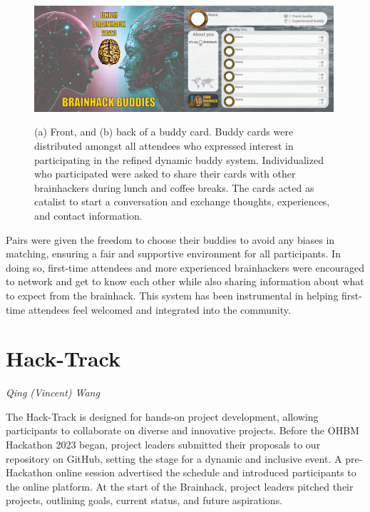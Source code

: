 \documentclass{article}
\newcommand\coordinator[1]{\begin{flushleft}\small\textit{#1}\end{flushleft}}
\begin{document}
\begin{figure}[hbt!]
    \centering
    \includegraphics[width=0.99\textwidth]{images/buddy-system.png}
    \label{fig:buddy-system}
    \caption{
        (a) Front, and (b) back of a buddy card.
        Buddy cards were distributed amongst all attendees who expressed interest in participating in the refined dynamic buddy system.
        Individualized who participated were asked to share their cards with other brainhackers during lunch and coffee breaks.
        The cards acted as catalist to start a conversation and exchange thoughts, experiences, and contact information.
    }
\end{figure}

Pairs were given the freedom to choose their buddies to avoid any biases in matching, ensuring a fair and supportive environment for all participants.
In doing so, first-time attendees and more experienced brainhackers were encouraged to network and get to know each other while also sharing information about what to expect from the brainhack.
This system has been instrumental in helping first-time attendees feel welcomed and integrated into the community.


\section{Hack-Track}
\coordinator{Qing (Vincent) Wang}

The Hack-Track is designed for hands-on project development, allowing participants to collaborate on diverse and innovative projects.
Before the OHBM Hackathon 2023 began, project leaders submitted their proposals to our repository on GitHub, setting the stage for a dynamic and inclusive event.
A pre-Hackathon online session advertised the schedule and introduced participants to the online platform.
At the start of the Brainhack, project leaders pitched their projects, outlining goals, current status, and future aspirations.
\end{document}
